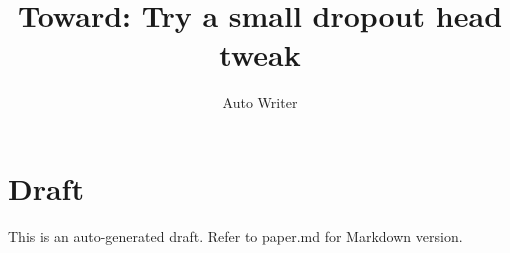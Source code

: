 \documentclass[11pt]{article}
\title{Toward: Try a small dropout head tweak}
\author{Auto Writer}
\date{}
\begin{document}
\maketitle
\section*{Draft}
This is an auto-generated draft. Refer to paper.md for Markdown version.




\end{document}
